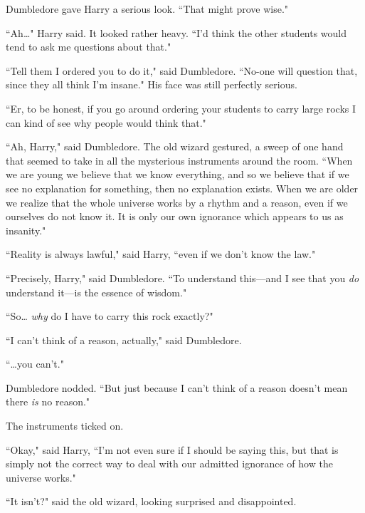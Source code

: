 Dumbledore gave Harry a serious look. ``That might prove wise."

``Ah{\ldots}" Harry said. It looked rather heavy. ``I'd think the other students would tend to ask me questions about that."

``Tell them I ordered you to do it," said Dumbledore. ``No-one will question that, since they all think I'm insane." His face was still perfectly serious.

``Er, to be honest, if you go around ordering your students to carry large rocks I can kind of see why people would think that."

``Ah, Harry," said Dumbledore. The old wizard gestured, a sweep of one hand that seemed to take in all the mysterious instruments around the room. ``When we are young we believe that we know everything, and so we believe that if we see no explanation for something, then no explanation exists. When we are older we realize that the whole universe works by a rhythm and a reason, even if we ourselves do not know it. It is only our own ignorance which appears to us as insanity."

``Reality is always lawful," said Harry, ``even if we don't know the law."

``Precisely, Harry," said Dumbledore. ``To understand this—and I see that you \emph{do} understand it—is the essence of wisdom."

``So{\ldots} \emph{why} do I have to carry this rock exactly?"

``I can't think of a reason, actually," said Dumbledore.

``{\ldots}you can't."

Dumbledore nodded. ``But just because I can't think of a reason doesn't mean there \emph{is} no reason."

The instruments ticked on.

``Okay," said Harry, ``I'm not even sure if I should be saying this, but that is simply not the correct way to deal with our admitted ignorance of how the universe works."

``It isn't?" said the old wizard, looking surprised and disappointed.

